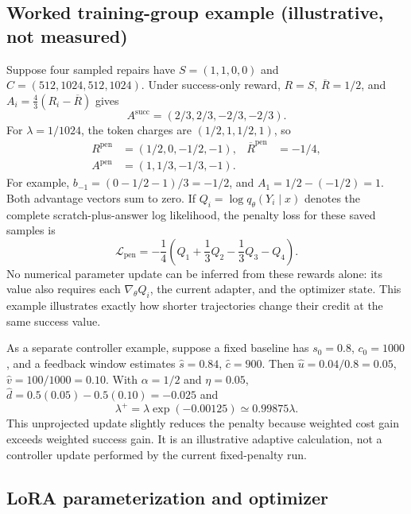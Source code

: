 \documentclass[11pt]{article}
\begin{document}
\subsection{Worked training-group example (illustrative, not measured)}

Suppose four sampled repairs have $S=(1,1,0,0)$ and $C=(512,1024,512,1024)$. Under success-only reward, $R=S$, $\overline R=1/2$, and $A_i=\tfrac43(R_i-\overline R)$ gives
\begin{equation}
 A^{\mathrm{succ}}=(2/3,2/3,-2/3,-2/3).
\end{equation}
For $\lambda=1/1024$, the token charges are $(1/2,1,1/2,1)$, so
\begin{align}
 R^{\mathrm{pen}}&=(1/2,0,-1/2,-1),&\overline R^{\mathrm{pen}}&=-1/4,\\
 A^{\mathrm{pen}}&=(1,1/3,-1/3,-1).
\end{align}
For example, $b_{-1}=(0-1/2-1)/3=-1/2$, and $A_1=1/2-(-1/2)=1$. Both advantage vectors sum to zero. If $Q_i=\log q_\theta(Y_i\mid x)$ denotes the complete scratch-plus-answer log likelihood, the penalty loss for these saved samples is
\begin{equation}
 \mathcal L_{\mathrm{pen}}=-\frac14
       \left(Q_1+\frac13Q_2-\frac13Q_3-Q_4\right).
\end{equation}
No numerical parameter update can be inferred from these rewards alone: its value also requires each $\nabla_\theta Q_i$, the current adapter, and the optimizer state. This example illustrates exactly how shorter trajectories change their credit at the same success value.

As a separate controller example, suppose a fixed baseline has $s_0=0.8$, $c_0=1000$, and a feedback window estimates $\widehat s=0.84$, $\widehat c=900$. Then $\widehat u=0.04/0.8=0.05$, $\widehat v=100/1000=0.10$. With $\alpha=1/2$ and $\eta=0.05$, $\widehat d=0.5(0.05)-0.5(0.10)=-0.025$ and
\begin{equation}
 \lambda^+=\lambda\exp(-0.00125)\simeq0.99875\lambda.
\end{equation}
This unprojected update slightly reduces the penalty because weighted cost gain exceeds weighted success gain. It is an illustrative adaptive calculation, not a controller update performed by the current fixed-penalty run.

\subsection{LoRA parameterization and optimizer}
\end{document}
